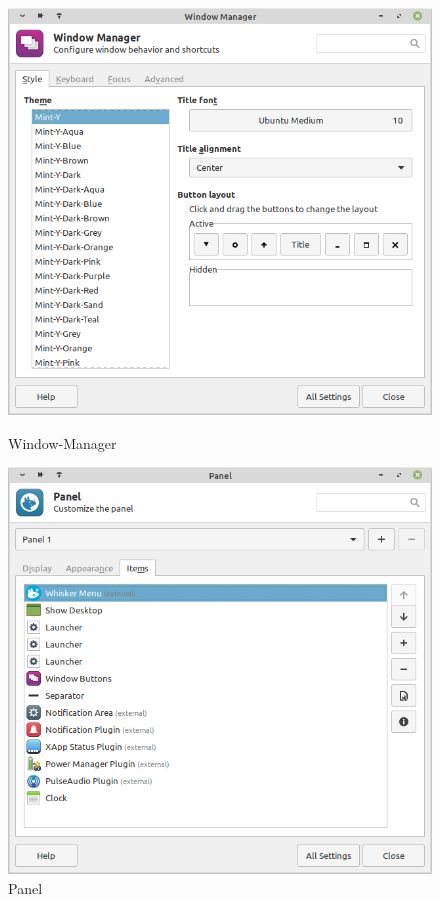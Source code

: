\begin{figure}[!htp]
    \begin{minipage}{0.49\textwidth}
        \centering
        \includegraphics[width=\linewidth]
            {input/task-2/3/Window-Manager.png}
        \caption{Window-Manager}
        \label{fig:Window-Manager}
    \end{minipage}
    \begin{minipage}{0.49\textwidth}
        \centering
        \includegraphics[width=\linewidth]
            {input/task-2/3/Panel.png}
        \caption{Panel}
        \label{fig:Panel}
    \end{minipage}
\end{figure}

